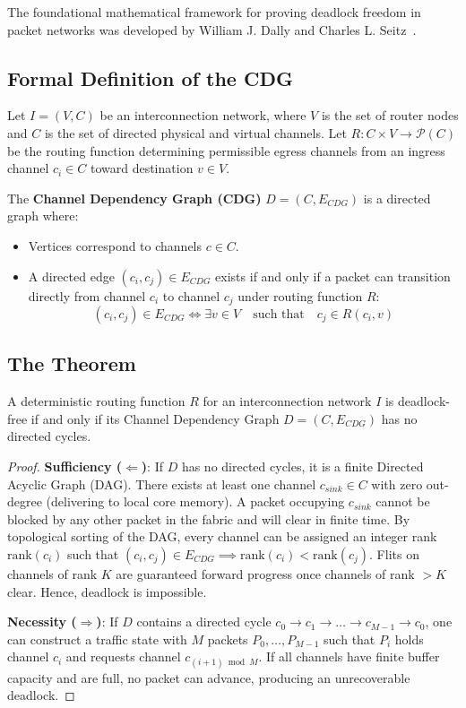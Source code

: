The foundational mathematical framework for proving deadlock freedom in packet networks was developed by William J. Dally and Charles L. Seitz~\cite{Dally1987}.

\subsection{Formal Definition of the CDG}
Let $I = (V, C)$ be an interconnection network, where $V$ is the set of router nodes and $C$ is the set of directed physical and virtual channels. Let $R: C \times V \to \mathcal{P}(C)$ be the routing function determining permissible egress channels from an ingress channel $c_i \in C$ toward destination $v \in V$.

The \textbf{Channel Dependency Graph (CDG)} $D = (C, E_{CDG})$ is a directed graph where:
\begin{itemize}
    \item Vertices correspond to channels $c \in C$.
    \item A directed edge $(c_i, c_j) \in E_{CDG}$ exists if and only if a packet can transition directly from channel $c_i$ to channel $c_j$ under routing function $R$:
    \begin{equation}
    (c_i, c_j) \in E_{CDG} \iff \exists v \in V \quad \text{such that} \quad c_j \in R(c_i, v)
    \label{eq:ch5_cdg_def}
    \end{equation}
\end{itemize}

\subsection{The Theorem}
\begin{theorem}
A deterministic routing function $R$ for an interconnection network $I$ is deadlock-free if and only if its Channel Dependency Graph $D = (C, E_{CDG})$ has no directed cycles.
\end{theorem}

\begin{proof}
\textbf{Sufficiency ($\Leftarrow$)}: If $D$ has no directed cycles, it is a finite Directed Acyclic Graph (DAG). There exists at least one channel $c_{sink} \in C$ with zero out-degree (delivering to local core memory). A packet occupying $c_{sink}$ cannot be blocked by any other packet in the fabric and will clear in finite time. By topological sorting of the DAG, every channel can be assigned an integer rank $\text{rank}(c_i)$ such that $(c_i, c_j) \in E_{CDG} \implies \text{rank}(c_i) < \text{rank}(c_j)$. Flits on channels of rank $K$ are guaranteed forward progress once channels of rank $> K$ clear. Hence, deadlock is impossible.

\textbf{Necessity ($\Rightarrow$)}: If $D$ contains a directed cycle $c_0 \to c_1 \to \dots \to c_{M-1} \to c_0$, one can construct a traffic state with $M$ packets $P_0, \dots, P_{M-1}$ such that $P_i$ holds channel $c_i$ and requests channel $c_{(i+1) \bmod M}$. If all channels have finite buffer capacity and are full, no packet can advance, producing an unrecoverable deadlock.
\end{proof}

